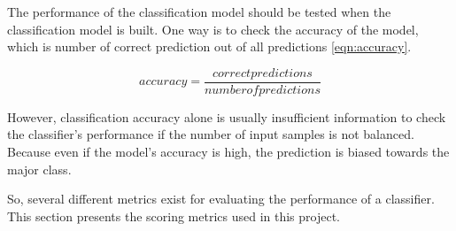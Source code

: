 The performance of the classification model should be tested when the classification model is built. One way is to check the accuracy of the model, which is number of correct prediction out of all predictions \ref{eqn:accuracy}. 


\begin{equation}
\label{eqn:accuracy}
accuracy = \frac{correct predictions}{number of predictions}
\end{equation}

However, classification accuracy alone is usually insufficient information to check the classifier's performance if the number of input samples is not balanced. Because even if the model's accuracy is high, the prediction is biased towards the major class. 

So, several different metrics exist for evaluating the performance of a classifier. This section presents the scoring metrics used in this project.

